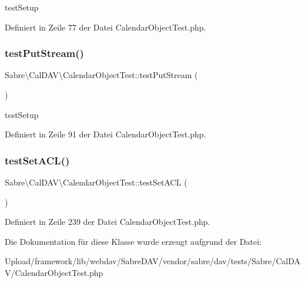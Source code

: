 test\+Setup 

Definiert in Zeile 77 der Datei Calendar\+Object\+Test.\+php.

\mbox{\label{class_sabre_1_1_cal_d_a_v_1_1_calendar_object_test_a89aeaf8dbe0770f37a5be70cf2193105}} 
\subsubsection{\texorpdfstring{test\+Put\+Stream()}{testPutStream()}}
{\footnotesize\ttfamily Sabre\textbackslash{}\+Cal\+D\+A\+V\textbackslash{}\+Calendar\+Object\+Test\+::test\+Put\+Stream (\begin{DoxyParamCaption}{ }\end{DoxyParamCaption})}

test\+Setup 

Definiert in Zeile 91 der Datei Calendar\+Object\+Test.\+php.

\mbox{\label{class_sabre_1_1_cal_d_a_v_1_1_calendar_object_test_a0511d89e2178e9e5389cea40cff8637d}} 
\subsubsection{\texorpdfstring{test\+Set\+A\+C\+L()}{testSetACL()}}
{\footnotesize\ttfamily Sabre\textbackslash{}\+Cal\+D\+A\+V\textbackslash{}\+Calendar\+Object\+Test\+::test\+Set\+A\+CL (\begin{DoxyParamCaption}{ }\end{DoxyParamCaption})}



Definiert in Zeile 239 der Datei Calendar\+Object\+Test.\+php.



Die Dokumentation für diese Klasse wurde erzeugt aufgrund der Datei\+:\begin{DoxyCompactItemize}
\item 
Upload/framework/lib/webdav/\+Sabre\+D\+A\+V/vendor/sabre/dav/tests/\+Sabre/\+Cal\+D\+A\+V/Calendar\+Object\+Test.\+php\end{DoxyCompactItemize}
